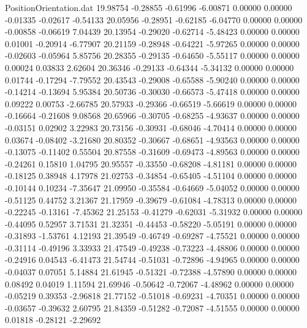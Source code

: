 \begin{filecontents}{PositionOrientation.dat}
  19.98754   -0.28855   -0.61996    -6.00871    0.00000    0.00000   -0.01335   -0.02617   -0.54133
  20.05956   -0.28951   -0.62185    -6.04770    0.00000    0.00000   -0.00858   -0.06619    7.04439
  20.13954   -0.29020   -0.62714    -5.48423    0.00000    0.00000    0.01001   -0.20914   -6.77907
  20.21159   -0.28948   -0.64221    -5.97265    0.00000    0.00000   -0.02603   -0.05964    5.85756
  20.28355   -0.29135   -0.64650    -5.55117    0.00000    0.00000    0.00024    0.03833    2.62604
  20.36346   -0.29133   -0.64344    -5.34132    0.00000    0.00000    0.01744   -0.17294   -7.79552
  20.43543   -0.29008   -0.65588    -5.90240    0.00000    0.00000   -0.14214   -0.13694    5.95384
  20.50736   -0.30030   -0.66573    -5.47418    0.00000    0.00000    0.09222    0.00753   -2.66785
  20.57933   -0.29366   -0.66519    -5.66619    0.00000    0.00000   -0.16664   -0.21608    9.08568
  20.65966   -0.30705   -0.68255    -4.93637    0.00000    0.00000   -0.03151    0.02902    3.22983
  20.73156   -0.30931   -0.68046    -4.70414    0.00000    0.00000    0.03674   -0.08402   -3.21680
  20.80352   -0.30667   -0.68651    -4.93563    0.00000    0.00000   -0.13075   -0.11402    0.55504
  20.87558   -0.31609   -0.69473    -4.89563    0.00000    0.00000   -0.24261    0.15810    1.04795
  20.95557   -0.33550   -0.68208    -4.81181    0.00000    0.00000   -0.18125    0.38948    4.17978
  21.02753   -0.34854   -0.65405    -4.51104    0.00000    0.00000   -0.10144    0.10234   -7.35647
  21.09950   -0.35584   -0.64669    -5.04052    0.00000    0.00000   -0.51125    0.44752    3.21367
  21.17959   -0.39679   -0.61084    -4.78313    0.00000    0.00000   -0.22245   -0.13161   -7.45362
  21.25153   -0.41279   -0.62031    -5.31932    0.00000    0.00000   -0.44095    0.52957    3.71531
  21.32351   -0.44453   -0.58220    -5.05191    0.00000    0.00000   -0.31893   -1.53761    4.12193
  21.39549   -0.46749   -0.69287    -4.75521    0.00000    0.00000   -0.31114   -0.49196    3.33933
  21.47549   -0.49238   -0.73223    -4.48806    0.00000    0.00000   -0.24916    0.04543   -6.41473
  21.54744   -0.51031   -0.72896    -4.94965    0.00000    0.00000   -0.04037    0.07051    5.14884
  21.61945   -0.51321   -0.72388    -4.57890    0.00000    0.00000    0.08492    0.04019    1.11594
  21.69946   -0.50642   -0.72067    -4.48962    0.00000    0.00000   -0.05219    0.39353   -2.96818
  21.77152   -0.51018   -0.69231    -4.70351    0.00000    0.00000   -0.03657   -0.39632    2.60795
  21.84359   -0.51282   -0.72087    -4.51555    0.00000    0.00000    0.01818   -0.28121   -2.29692

\end{filecontents}
